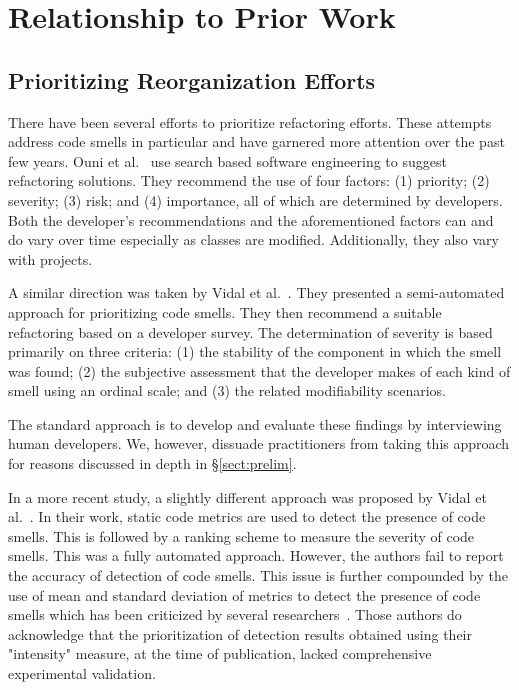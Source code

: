 \documentclass[twocolumn,5p]{elsarticle}
\newcommand{\tion}[1]{\S\ref{sect:#1}}
\theoremstyle{break}
\begin{document}
	\section{Relationship to Prior Work }
	\label{sect:prior0}
	{\color{steel}	
	\subsection{Prioritizing Reorganization Efforts}
	\label{sect:prior}

		There have been several efforts to prioritize refactoring efforts. 
		These attempts address code smells in particular and have garnered more 
		attention over the past few years. Ouni et al.~\cite{ouni3,ouni1,ouni2} 
		use search 
		based software engineering to suggest refactoring solutions. They 
		recommend the use of four 
		factors: (1) priority; (2) severity; (3) risk; and (4) importance, all 
		of which are determined by developers. Both the developer's 
		recommendations and the aforementioned factors can and do vary over 
		time especially as classes are modified. Additionally, they also vary 
		with projects. 
		
		A similar direction was taken by Vidal et al.~\cite{vidal14}. They 
		presented a semi-automated approach for prioritizing code smells. They 
		then recommend a suitable refactoring based on a developer survey. The 
		determination of severity is based primarily on three criteria: (1) the 
		stability of the component in which the smell was found; (2) the 
		subjective assessment that the developer makes of each kind of smell 
		using an ordinal scale; and (3) the related modifiability scenarios.
		
		The standard approach is to develop and evaluate these findings by 
		interviewing human developers. We, however, dissuade practitioners 
		from taking this approach for reasons discussed in depth in 
		\tion{prelim}.
		
		In a more recent study, a slightly different approach was proposed by 
		Vidal et al.~\cite{font1}. In their work, static code metrics are used 
		to detect the presence of code smells. This is followed by a ranking 
		scheme to measure the severity of code smells. This was a fully 
		automated approach. However, the authors fail to report the accuracy 
		of 
		detection of code smells. This issue is further compounded by the use 
		of mean and standard deviation of metrics to detect the presence of 
		code smells which has been criticized by several  
		researchers~\cite{Shatnawi10,Alves2010}. Those authors do acknowledge 
		that the prioritization of detection results obtained using their 
		"intensity" measure, at the time of publication, lacked comprehensive 
		experimental validation.
		
}
\end{document}
